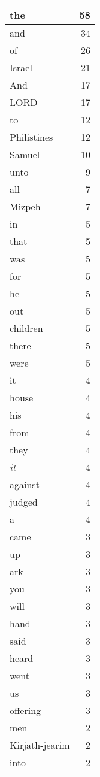 \begin{center}
\begin{longtable}{l|r}
\hline \hline
\endlastfoot
the & 58 \\ \hline
and & 34 \\ \hline
of & 26 \\ \hline
Israel & 21 \\ \hline
And & 17 \\ \hline
LORD & 17 \\ \hline
to & 12 \\ \hline
Philistines & 12 \\ \hline
Samuel & 10 \\ \hline
unto & 9 \\ \hline
all & 7 \\ \hline
Mizpeh & 7 \\ \hline
in & 5 \\ \hline
that & 5 \\ \hline
was & 5 \\ \hline
for & 5 \\ \hline
he & 5 \\ \hline
out & 5 \\ \hline
children & 5 \\ \hline
there & 5 \\ \hline
were & 5 \\ \hline
it & 4 \\ \hline
house & 4 \\ \hline
his & 4 \\ \hline
from & 4 \\ \hline
they & 4 \\ \hline
\emph{it} & 4 \\ \hline
against & 4 \\ \hline
judged & 4 \\ \hline
a & 4 \\ \hline
came & 3 \\ \hline
up & 3 \\ \hline
ark & 3 \\ \hline
you & 3 \\ \hline
will & 3 \\ \hline
hand & 3 \\ \hline
said & 3 \\ \hline
heard & 3 \\ \hline
went & 3 \\ \hline
us & 3 \\ \hline
offering & 3 \\ \hline
men & 2 \\ \hline
Kirjath-jearim & 2 \\ \hline
into & 2 \\ \hline

\end{longtable}
\end{center}

